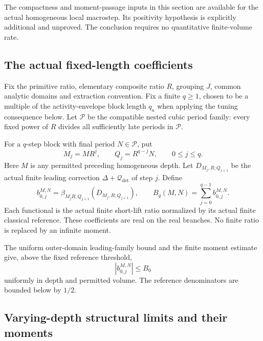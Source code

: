 \documentclass[11pt]{article}
\theoremstyle{remark}
\begin{document}
The compactness and moment-passage inputs in this section are
available for the actual homogeneous local macrostep. Its
positivity hypothesis is explicitly additional and unproved.
The conclusion requires no quantitative finite-volume rate.

\subsection{The actual fixed-length coefficients}
\label{fbt-setup}

Fix the primitive ratio, elementary composite ratio \(R\),
grouping \(J\), common analytic domains and extraction
convention. Fix a finite \(q\ge1\), chosen to be a multiple
of the activity-envelope block length \(q_a\) when applying
the tuning consequence below. Let \(\mathcal P\) be the
compatible nested cubic period family: every fixed power
of \(R\) divides all sufficiently late periods in
\(\mathcal P\).

For a \(q\)-step block with final period \(N\in\mathcal P\),
put
\begin{equation}
 M_j=MR^j,\qquad Q_j=R^{q-j}N,\qquad 0\le j\le q.
 \label{fbt-block-scales}
\end{equation}
Here \(M\) is any permitted preceding homogeneous depth.
Let \(D_{M_j,R;Q_{j+1}}\) be the actual finite leading
correction \(\Delta+\mathcal Q_{\det}\) of step \(j\).
Define
\begin{equation}
 b_{0,j}^{M,N}
    =\beta_{M_jR,Q_{j+1}}(D_{M_j,R;Q_{j+1}}),
 \qquad
 B_q(M,N)=\sum_{j=0}^{q-1}b_{0,j}^{M,N}.
 \label{fbt-finite-coefficients}
\end{equation}
Each functional is the actual finite short-lift ratio
normalized by its actual finite classical reference.
These coefficients are real on the real branches.
No finite ratio is replaced by an infinite moment.

The uniform outer-domain leading-family bound and the
finite moment estimate give, above the fixed reference
threshold,
\begin{equation}
                          |b_{0,j}^{M,N}|\le B_0
 \label{fbt-leading-bound}
\end{equation}
uniformly in depth and permitted volume. The reference
denominators are bounded below by \(1/2\).

\subsection{Varying-depth structural limits and their moments}
\label{fbt-compactness}
\end{document}
